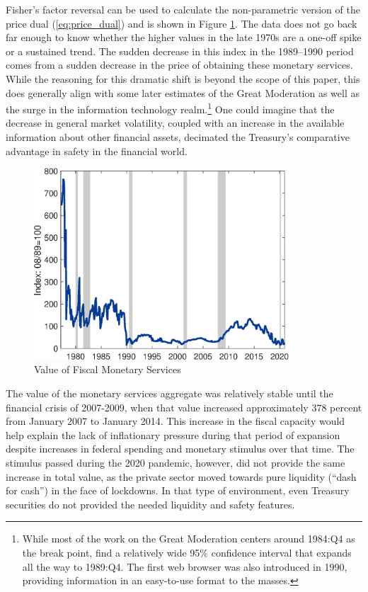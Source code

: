 \documentclass[11pt,a4paper,margin=1.5in]{article}
\begin{document}
Fisher's factor reversal can be used to calculate the non-parametric version of the price dual (\ref{eq:price_dual}) and is shown in Figure \ref{fig:FiscalServices_Value}.
The data does not go back far enough to know whether the higher values in the late 1970s are a one-off spike or a sustained trend. 
The sudden decrease in this index in the 1989--1990 period comes from a sudden decrease in the price of obtaining these monetary services.
While the reasoning for this dramatic shift is beyond the scope of this paper, this does generally align with some later estimates of the Great Moderation as well as the surge in the information technology realm.\footnote{
	While most of the work on the Great Moderation centers around 1984:Q4 as the break point, \citet{Stock-Watson:2002} find a relatively wide 95\% confidence interval that expands all the way to 1989:Q4.
	The first web browser was also introduced in 1990, providing information in an easy-to-use format to the masses.}
One could imagine that the decrease in general market volatility, coupled with an increase in the available information about other financial assets, decimated the Treasury's comparative advantage in safety in the financial world.
\begin{figure}[h!]
\centering
\includegraphics[width=0.85\textwidth]{../Figures/FiscalCapacity_Index.eps}
\caption{Value of Fiscal Monetary Services}
\label{fig:FiscalServices_Value}
\end{figure}

The value of the monetary services aggregate was relatively stable until the financial crisis of 2007-2009, when that value increased approximately 378 percent from January 2007 to January 2014. 
This increase in the fiscal capacity would help explain the lack of inflationary pressure during that period of expansion despite increases in federal spending and monetary stimulus over that time.
The stimulus passed during the 2020 pandemic, however, did not provide the same increase in total value, as the private sector moved towards pure liquidity (``dash for cash'') in the face of lockdowns.
In that type of environment, even Treasury securities do not provided the needed liquidity and safety features.
\newpage
\end{document}
